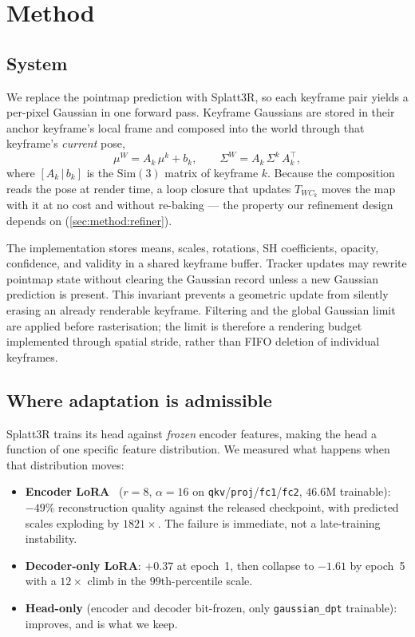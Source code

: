 \section{Method}
\label{sec:method}

\subsection{System}
We replace the pointmap prediction with Splatt3R, so each keyframe pair yields
a per-pixel Gaussian in one forward pass. Keyframe Gaussians are stored in
their anchor keyframe's local frame and composed into the world through that
keyframe's \emph{current} pose,
\begin{equation}
\mu^{W} = A_k\,\mu^{k} + b_k, \qquad
\Sigma^{W} = A_k\,\Sigma^{k}\,A_k^{\top},
\label{eq:anchor}
\end{equation}
where $[A_k\,|\,b_k]$ is the $\mathrm{Sim}(3)$ matrix of keyframe $k$. Because
the composition reads the pose at render time, a loop closure that updates
$T_{WC_k}$ moves the map with it at no cost and without re-baking --- the
property our refinement design depends on
(\cref{sec:method:refiner}).

The implementation stores means, scales, rotations, SH coefficients, opacity,
confidence, and validity in a shared keyframe buffer. Tracker updates may
rewrite pointmap state without clearing the Gaussian record unless a new
Gaussian prediction is present. This invariant prevents a geometric update
from silently erasing an already renderable keyframe. Filtering and the
global Gaussian limit are applied before rasterisation; the limit is therefore
a rendering budget implemented through spatial stride, rather than FIFO
deletion of individual keyframes.

\subsection{Where adaptation is admissible}
\label{sec:method:head}

Splatt3R trains its head against \emph{frozen} encoder features, making the
head a function of one specific feature distribution. We measured what happens
when that distribution moves:

\begin{itemize}\itemsep2pt
\item \textbf{Encoder LoRA}~\cite{hu2022lora} ($r{=}8$, $\alpha{=}16$ on
      \texttt{qkv}/\texttt{proj}/\texttt{fc1}/\texttt{fc2}, $46.6$M trainable):
      $-49\%$ reconstruction quality against the released checkpoint, with
      predicted scales exploding by $1821\times$. The failure is immediate,
      not a late-training instability.
\item \textbf{Decoder-only LoRA}: $+0.37$\dB{} at epoch~1, then collapse to
      $-1.61$\dB{} by epoch~5 with a $12\times$ climb in the $99$th-percentile
      scale.
\item \textbf{Head-only} (encoder and decoder bit-frozen, only
      \texttt{gaussian\_dpt} trainable): improves, and is what we keep.
\end{itemize}

